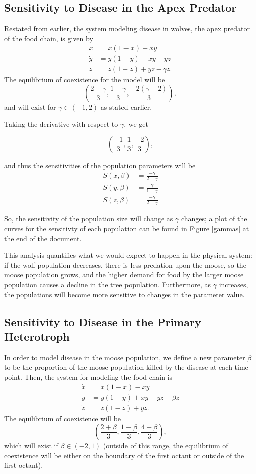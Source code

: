 \documentclass[10pt]{article}
\begin{document}
\subsection{Sensitivity to Disease in the Apex Predator}
Restated from earlier, the system modeling disease in wolves, the apex predator of the food chain, is given by 
\begin{align*}
\dot{x} &= x(1-x)-xy \\
\dot{y} &= y(1-y)+xy-yz \\
\dot{z} &= z(1-z)+yz - \gamma z.
\end{align*}
The equilibrium of coexistence for the model will be
\[ \left(  \frac{2-\gamma}{3}, \frac{1+\gamma}{3}, \frac{-2(\gamma-2)}{3} \right),\]
and will exist for \(\gamma \in (-1,2)\) as stated earlier.

Taking the derivative with respect to \(\gamma\), we get

\[\left(  \frac{-1}{3},\frac{1}{3},\frac{-2}{3} \right),\]

and thus the sensitivities of the population parameters will be
\begin{align*}
S(x,\beta) &= \frac{-\gamma}{2-\gamma} \\
S(y,\beta) &= \frac{\gamma}{1+\gamma} \\
S(z,\beta) &= \frac{-\gamma}{2-\gamma}
\end{align*}

So, the sensitivity of the population size will change as \(\gamma\) changes; a plot of the curves for the sensitivty of each population can be found in Figure \ref{gammas} at the end of the document.

This analysis quantifies what we would expect to happen in the physical system: if the wolf population decreases, there is less predation upon the moose, so the moose population grows, and the higher demand for food by the larger moose population causes a decline in the tree population. Furthermore, as \(\gamma\) increases, the populations will become more sensitive to changes in the parameter value.

\subsection{Sensitivity to Disease in the Primary Heterotroph}
In order to model disease in the moose population, we define a new parameter \(\beta\) to be the proportion of the moose population killed by the disease at each time point. Then, the system for modeling the food chain is
\begin{align*}
\dot{x} &= x(1-x)-xy \\
\dot{y} &= y(1-y)+xy-yz-\beta z \\
\dot{z} &= z(1-z)+yz.
\end{align*}
The equilibrium of coexistence will be
\[\left(  \frac{2+\beta}{3},\frac{1-\beta}{3},\frac{4-\beta}{3} \right),\]
which will exist if \(\beta \in (-2,1)\) (outside of this range, the equilibrium of coexistence will be either on the boundary of the first octant or outside of the first octant).
\end{document}
